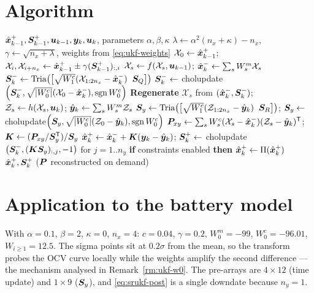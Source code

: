 \section{Algorithm}
\begin{algorithm}[H]
\caption{SR-UKF --- one sampling period (additive noise)}
\begin{algorithmic}[1]
\Require $\hat{\bm{x}}^{+}_{k-1},\bm{S}^+_{k-1},\bm{u}_{k-1},\bm{y}_k,\bm{u}_k$, parameters $\alpha,\beta,\kappa$
\State $\lambda\gets\alpha^2(n_x{+}\kappa)-n_x$, $\gamma\gets\sqrt{n_x{+}\lambda}$, weights from \eqref{eq:ukf-weights}
\State $\mathcal{X}_0\gets\hat{\bm{x}}^{+}_{k-1}$;\; $\mathcal{X}_{i},\mathcal{X}_{i+n_x}\gets\hat{\bm{x}}^{+}_{k-1}\pm\gamma(\bm{S}^+_{k-1})_{:,i}$
\State $\mathcal{X}_s\gets f(\mathcal{X}_s,\bm{u}_{k-1})$;\; $\hat{\bm{x}}^{-}_k\gets\sum_s W^m_s\mathcal{X}_s$
\State $\bm{S}^-_k\gets\operatorname{Tria}\!\left(\left[\sqrt{W^c_1}(\mathcal{X}_{1:2n_x}-\hat{\bm{x}}^{-}_k)\;\;\bm{S}_Q\right]\right)$
\State $\bm{S}^-_k\gets$ cholupdate$\left(\bm{S}^-_k,\sqrt{|W^c_0|}(\mathcal{X}_0-\hat{\bm{x}}^{-}_k),\operatorname{sgn} W^c_0\right)$
\State \textbf{Regenerate} $\mathcal{X}_s$ from $(\hat{\bm{x}}^{-}_k,\bm{S}^-_k)$;\;
       $\mathcal{Z}_s\gets h(\mathcal{X}_s,\bm{u}_k)$;\; $\hat{\bm{y}}_k\gets\sum_s W^m_s\mathcal{Z}_s$
\State $\bm{S}_y\gets\operatorname{Tria}\!\left(\left[\sqrt{W^c_1}(\mathcal{Z}_{1:2n_x}-\hat{\bm{y}}_k)\;\;\bm{S}_R\right]\right)$;\;
       $\bm{S}_y\gets$ cholupdate$\left(\bm{S}_y,\sqrt{|W^c_0|}(\mathcal{Z}_0-\hat{\bm{y}}_k),\operatorname{sgn} W^c_0\right)$
\State $\bm{P}_{xy}\gets\sum_s W^c_s(\mathcal{X}_s-\hat{\bm{x}}^{-}_k)(\mathcal{Z}_s-\hat{\bm{y}}_k)^{\mathsf{T}}$;\;
       $\bm{K}\gets(\bm{P}_{xy}/\bm{S}_y^{\mathsf{T}})/\bm{S}_y$
\State $\hat{\bm{x}}^{+}_k\gets\hat{\bm{x}}^{-}_k+\bm{K}(\bm{y}_k-\hat{\bm{y}}_k)$;\;
       $\bm{S}^+_k\gets$ cholupdate$\left(\bm{S}^-_k,(\bm{K}\bm{S}_y)_{:,j},-1\right)$ for $j=1..n_y$
\State \textbf{if} constraints enabled \textbf{then} $\hat{\bm{x}}^{+}_k\gets\Pi(\hat{\bm{x}}^{+}_k)$
\Ensure $\hat{\bm{x}}^{+}_k,\bm{S}^+_k$ \quad ($\bm{P}$ reconstructed on demand)
\end{algorithmic}
\end{algorithm}

\section{Application to the battery model}
With $\alpha=0.1$, $\beta=2$, $\kappa=0$, $n_x=4$: $c = 0.04$, $\gamma = 0.2$,
$W_0^m = -99$, $W_0^c = -96.01$, $W_{i\ge1} = 12.5$. The sigma points sit at $0.2\sigma$ from
the mean, so the transform probes the OCV curve locally while the weights amplify the second
difference --- the mechanism analysed in Remark~\ref{rm:ukf-w0}. The pre-arrays are
$4\times12$ (time update) and $1\times9$ ($\bm{S}_y$), and \eqref{eq:srukf-post} is a single
downdate because $n_y=1$.


